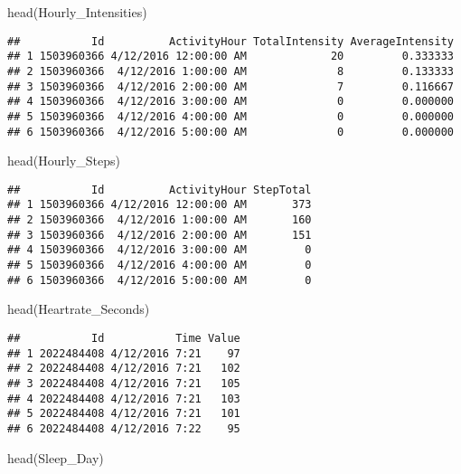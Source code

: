 \documentclass[
]{article}
\newenvironment{Shaded}{\begin{snugshade}}{\end{snugshade}}
\newcommand{\FunctionTok}[1]{\textcolor[rgb]{0.00,0.00,0.00}{#1}}
\newcommand{\NormalTok}[1]{#1}
\begin{document}
\begin{Shaded}
\begin{Highlighting}[]
\FunctionTok{head}\NormalTok{(Hourly\_Intensities)}
\end{Highlighting}
\end{Shaded}

\begin{verbatim}
##           Id          ActivityHour TotalIntensity AverageIntensity
## 1 1503960366 4/12/2016 12:00:00 AM             20         0.333333
## 2 1503960366  4/12/2016 1:00:00 AM              8         0.133333
## 3 1503960366  4/12/2016 2:00:00 AM              7         0.116667
## 4 1503960366  4/12/2016 3:00:00 AM              0         0.000000
## 5 1503960366  4/12/2016 4:00:00 AM              0         0.000000
## 6 1503960366  4/12/2016 5:00:00 AM              0         0.000000
\end{verbatim}

\begin{Shaded}
\begin{Highlighting}[]
\FunctionTok{head}\NormalTok{(Hourly\_Steps)}
\end{Highlighting}
\end{Shaded}

\begin{verbatim}
##           Id          ActivityHour StepTotal
## 1 1503960366 4/12/2016 12:00:00 AM       373
## 2 1503960366  4/12/2016 1:00:00 AM       160
## 3 1503960366  4/12/2016 2:00:00 AM       151
## 4 1503960366  4/12/2016 3:00:00 AM         0
## 5 1503960366  4/12/2016 4:00:00 AM         0
## 6 1503960366  4/12/2016 5:00:00 AM         0
\end{verbatim}

\begin{Shaded}
\begin{Highlighting}[]
\FunctionTok{head}\NormalTok{(Heartrate\_Seconds)}
\end{Highlighting}
\end{Shaded}

\begin{verbatim}
##           Id           Time Value
## 1 2022484408 4/12/2016 7:21    97
## 2 2022484408 4/12/2016 7:21   102
## 3 2022484408 4/12/2016 7:21   105
## 4 2022484408 4/12/2016 7:21   103
## 5 2022484408 4/12/2016 7:21   101
## 6 2022484408 4/12/2016 7:22    95
\end{verbatim}

\begin{Shaded}
\begin{Highlighting}[]
\FunctionTok{head}\NormalTok{(Sleep\_Day)}
\end{Highlighting}
\end{Shaded}
\end{document}
